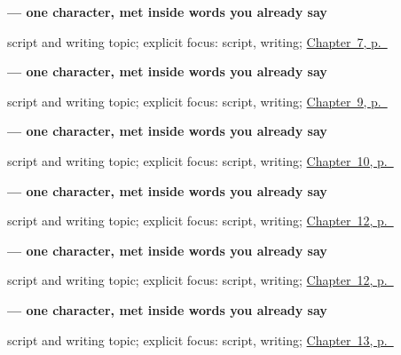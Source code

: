\noindent\begin{minipage}[t]{\linewidth}
\raggedright
\textbf{ — one character, met inside words you already say}\par
\footnotesize script and writing topic; explicit focus: script, writing; \hyperref[ch:te-numbers-one-to-ten]{Chapter~7, p.~\pageref*{ch:te-numbers-one-to-ten}}
\end{minipage}\par\smallskip

\noindent\begin{minipage}[t]{\linewidth}
\raggedright
\textbf{ — one character, met inside words you already say}\par
\footnotesize script and writing topic; explicit focus: script, writing; \hyperref[ch:te-sorry]{Chapter~9, p.~\pageref*{ch:te-sorry}}
\end{minipage}\par\smallskip

\noindent\begin{minipage}[t]{\linewidth}
\raggedright
\textbf{ — one character, met inside words you already say}\par
\footnotesize script and writing topic; explicit focus: script, writing; \hyperref[ch:te-days-of-the-week]{Chapter~10, p.~\pageref*{ch:te-days-of-the-week}}
\end{minipage}\par\smallskip

\noindent\begin{minipage}[t]{\linewidth}
\raggedright
\textbf{ — one character, met inside words you already say}\par
\footnotesize script and writing topic; explicit focus: script, writing; \hyperref[ch:te-family]{Chapter~12, p.~\pageref*{ch:te-family}}
\end{minipage}\par\smallskip

\noindent\begin{minipage}[t]{\linewidth}
\raggedright
\textbf{ — one character, met inside words you already say}\par
\footnotesize script and writing topic; explicit focus: script, writing; \hyperref[ch:te-family]{Chapter~12, p.~\pageref*{ch:te-family}}
\end{minipage}\par\smallskip

\noindent\begin{minipage}[t]{\linewidth}
\raggedright
\textbf{ — one character, met inside words you already say}\par
\footnotesize script and writing topic; explicit focus: script, writing; \hyperref[ch:te-head-and-hand]{Chapter~13, p.~\pageref*{ch:te-head-and-hand}}
\end{minipage}\par\smallskip

